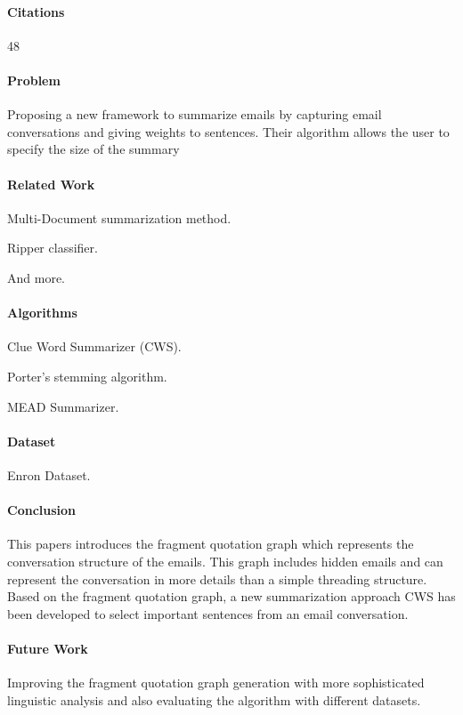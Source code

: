 \documentclass[12pt]{article}
\newenvironment{my_itemize}
{\begin{itemize}
  \setlength{\itemsep}{0cm}
  \setlength{\parskip}{0cm}}
{\end{itemize}}
\begin{document}
\paragraph{Citations} 48

\paragraph{Problem} 
Proposing a new framework to summarize emails by capturing email conversations 
and giving weights to sentences. Their algorithm allows the user to specify the size of the summary

\paragraph{Related Work}
\begin{my_itemize}
  \item Multi-Document summarization method.
  \item Ripper classifier.
  \item And more.
\end{my_itemize}

\paragraph{Algorithms}
\begin{my_itemize}
  \item Clue Word Summarizer (CWS).
  \item Porter’s stemming algorithm.
  \item MEAD Summarizer.
\end{my_itemize}

\paragraph{Dataset} Enron Dataset.

\paragraph{Conclusion}
This papers introduces the fragment quotation graph which represents the 
conversation structure of the emails. This graph includes hidden emails and can 
represent the conversation in more details than a simple threading structure.
Based on the fragment quotation graph, a new summarization approach CWS has 
been developed to select important sentences from an email conversation.

\paragraph{Future Work}
Improving the fragment quotation graph generation with more sophisticated linguistic
analysis and also evaluating the algorithm with different datasets.
\end{document}
